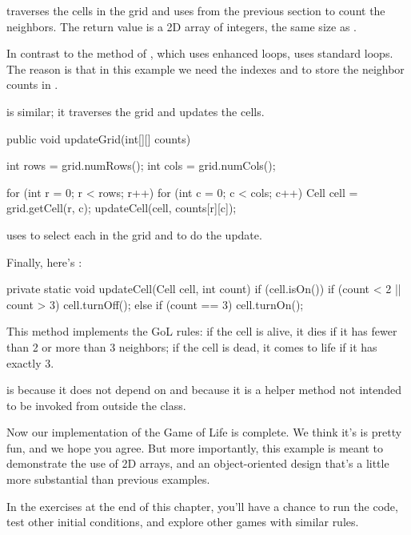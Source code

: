 traverses the cells in the grid and
uses  from the previous section to count the neighbors.
The return value is a 2D array of integers, the same size as .

In contrast to the  method of , which uses enhanced  loops,  uses standard  loops.
The reason is that in this example we need the indexes  and  to store the neighbor counts in .

 is similar; it traverses the grid and updates the cells.

\begin{code}
	public void updateGrid(int[][] counts) {
		int rows = grid.numRows();
        int cols = grid.numCols();

        for (int r = 0; r < rows; r++) {
            for (int c = 0; c < cols; c++) {
                Cell cell = grid.getCell(r, c);
                updateCell(cell, counts[r][c]);
            }
        }
	}
\end{code}

 uses  to select each  in the grid and  to do the update.

Finally, here's :

\begin{code}
private static void updateCell(Cell cell, int count) {
    if (cell.isOn()) {
        if (count < 2 || count > 3) {
            cell.turnOff();
        }
    } else {
        if (count == 3) {
            cell.turnOn();
        }
    }
}
\end{code}

This method implements the GoL rules: if the cell is alive, it dies if it has fewer than 2 or more than 3 neighbors; if the cell is dead, it comes to life if it has exactly 3.

 is  because it does not depend on  and  because it is a helper method not intended to be invoked from outside the class.

Now our implementation of the Game of Life is complete.
We think it's is pretty fun, and we hope you agree.
But more importantly, this example is meant to demonstrate the use of 2D arrays, and an object-oriented design that's a little more substantial than previous examples.

In the exercises at the end of this chapter, you'll have a chance to run the code, test other initial conditions, and explore other games with similar rules.


